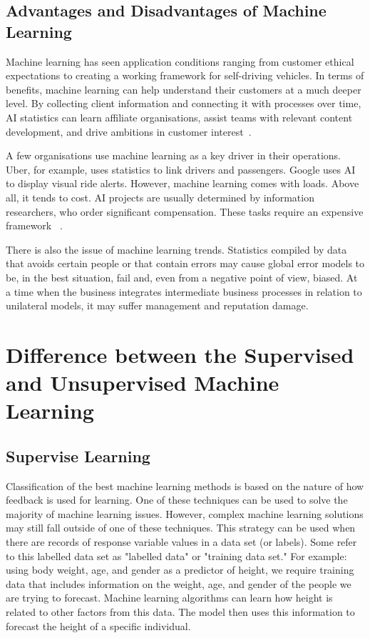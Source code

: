 \documentclass[10pt]{aa}
\begin{document}
\subsection{\textbf{Advantages and Disadvantages of Machine Learning}}
Machine learning has seen application conditions ranging from customer ethical expectations to creating a working framework for self-driving vehicles. In terms of benefits, machine learning can help understand their customers at a much deeper level. By collecting client information and connecting it with processes over time, AI statistics can learn affiliate organisations, assist teams with relevant content development, and drive ambitions in customer interest~\cite{senaviratna_2019_diagnosing}.

A few organisations use machine learning as a key driver in their operations. Uber, for example, uses statistics to link drivers and passengers. Google uses AI to display visual ride alerts. However, machine learning comes with loads. Above all, it tends to cost. AI projects are usually determined by information researchers, who order significant compensation. These tasks require an expensive framework ~\cite{greener_2021_a}.

There is also the issue of machine learning trends. Statistics compiled by data that avoids certain people or that contain errors may cause global error models to be, in the best situation, fail and, even from a negative point of view, biased. At a time when the business integrates intermediate business processes in relation to unilateral models, it may suffer management and reputation damage.


\section{Difference between the Supervised and Unsupervised Machine Learning}
\subsection{Supervise Learning}
Classification of the best machine learning methods is based on the nature of how feedback is used for learning. One of these techniques can be used to solve the majority of machine learning issues. However, complex machine learning solutions may still fall outside of one of these techniques. This strategy can be used when there are records of response variable values in a data set (or labels). Some refer to this labelled data set as "labelled data" or "training data set."
For example: using body weight, age, and gender as a predictor of height, we require training data that includes information on the weight, age, and gender of the people we are trying to forecast. Machine learning algorithms can learn how height is related to other factors from this data. The model then uses this information to forecast the height of a specific individual.
\end{document}
